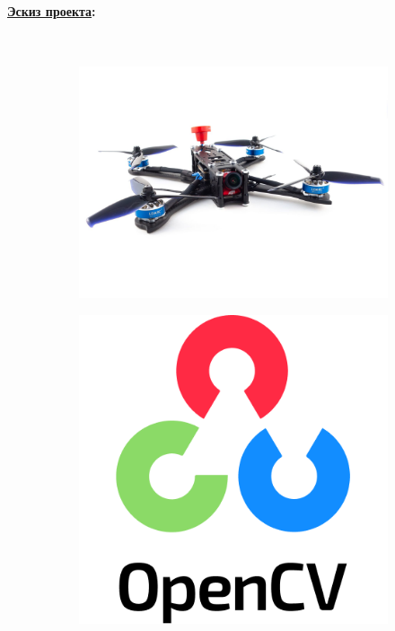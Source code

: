 \documentclass[a4paper,12pt]{article} %
\begin{document}
\paragraph{\underline{Эскиз проекта}:}\
\begin{figure}[h]
    \centering
    \begin{subfigure}{0.4\textwidth}
        \includegraphics[width=\linewidth]{../img/drone.jpg}
    \end{subfigure}
    \hfill
    \begin{subfigure}{0.2\textwidth}
        \includegraphics[width=\linewidth]{../img/opencv.png}

\end{subfigure}
\end{figure}
\end{document}
